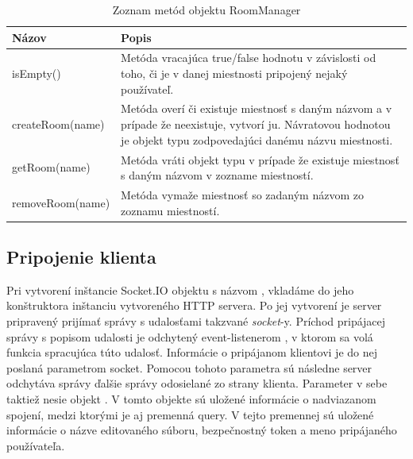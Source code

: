 \begin{table}
	\begin{tabular}{ | m{4cm} | m{8.5cm} | } \hline
		\textbf{Názov} & \textbf{Popis} \\ \hline
		
		isEmpty() & Metóda vracajúca true/false hodnotu v závislosti od toho, či je v danej miestnosti pripojený nejaký používateľ. \\\hline
		createRoom(name) & Metóda overí či existuje miestnosť s daným názvom a v prípade že neexistuje, vytvorí ju. Návratovou hodnotou je objekt typu \code{Room} zodpovedajúci danému názvu miestnosti. \\\hline
		getRoom(name) & Metóda vráti objekt typu \code{Room} v prípade že existuje miestnosť s daným názvom v zozname miestností. \\\hline
		removeRoom(name) & Metóda vymaže miestnosť so zadaným názvom zo zoznamu miestností. \\\hline
		
		\hline
	\end{tabular}
	\caption{Zoznam metód objektu RoomManager}
	\label{tab:server-func-roommanager}
\end{table}
\FloatBarrier

\subsection{Pripojenie klienta}

Pri vytvorení inštancie Socket.IO objektu s názvom , vkladáme do jeho konštruktora inštanciu vytvoreného HTTP servera. Po jej vytvorení je server pripravený prijímať správy s udalosťami takzvané \textit{socket}-y. Príchod pripájacej správy s popisom udalosti   je odchytený event-listenerom  , v ktorom sa volá funkcia spracujúca túto udalosť. Informácie o pripájanom klientovi je do nej poslaná parametrom socket. Pomocou tohoto parametra sú následne server odchytáva správy ďalšie správy odosielané zo strany klienta. Parameter v sebe taktiež nesie objekt . V tomto objekte sú uložené informácie o nadviazanom spojení, medzi ktorými je aj premenná query. V tejto premennej sú uložené informácie o názve editovaného súboru, bezpečnostný token a meno pripájaného používateľa.



